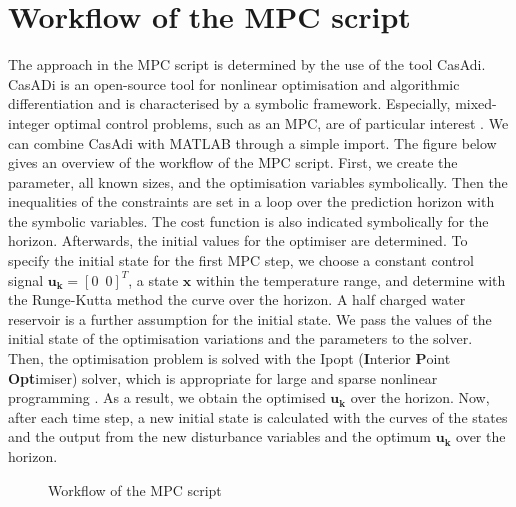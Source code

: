 \section{Workflow of the MPC script}
\label{section:workflowMPC}
The approach in the MPC script is determined by the use of the tool CasAdi. CasADi is an open-source tool for nonlinear optimisation and algorithmic differentiation and is characterised by a symbolic framework. Especially, mixed-integer optimal control problems, such as an MPC, are of particular interest \cite{JoelA.E.Andersson.2018}. We can combine CasAdi with MATLAB through a simple import.\newline
The figure below gives an overview of the workflow of the MPC script. First, we create the parameter, all known sizes, and the optimisation variables symbolically. Then the inequalities of the constraints are set in a loop over the prediction horizon with the symbolic variables. The cost function is also indicated symbolically for the horizon. Afterwards, the initial values for the optimiser are determined. To specify the initial state for the first MPC step, we choose a constant control signal $\mathbf{u_k} = [0\enspace0]^T$, a state $\mathbf{x}$ within the temperature range, and determine with the Runge-Kutta method the curve over the horizon. A half charged water reservoir is a further assumption for the initial state. We pass the values of the initial state of the optimisation variations and the parameters to the solver. Then, the optimisation problem is solved with the Ipopt (\textbf{I}nterior \textbf{P}oint \textbf{Opt}imiser) solver, which is appropriate for large and sparse nonlinear programming \cite{JoelA.E.Andersson.2018}. As a result, we obtain the optimised $\mathbf{u_k}$ over the horizon. Now, after each time step, a new initial state is calculated with the curves of the states and the output from the new disturbance variables and the optimum $\mathbf{u_k}$ over the horizon.
    \begin{figure}[h]
            \centering
            \def\svgwidth{0.75\textwidth}
            
            \caption{Workflow of the MPC script}
            \label{fig:workflowMPC}
    \end{figure}
    

